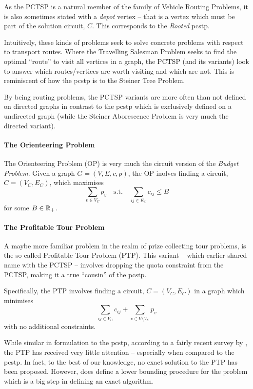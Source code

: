As the PCTSP is a natural member of the family of Vehicle Routing Problems, it is also sometimes
stated with a \textit{depot} vertex \citep{feillet2005traveling} -- that is a vertex which
must be part of the solution circuit, $C$. This corresponds to the \textit{Rooted}
\gls{pcstp}.

Intuitively, these kinds of problems seek to solve concrete problems with respect to transport routes.
Where the Travelling Salesman Problem seeks to find the optimal ``route'' to visit all vertices in
a graph, the PCTSP (and its variants) look to answer which routes/vertices are worth visiting and
which are not. This is reminiscent of how the \gls{pcstp} is to the Steiner Tree Problem.

By being routing problems, the PCTSP variants are more often than not defined on directed graphs in
contrast to the \gls{pcstp} which is exclusively defined on a undirected graph (while the Steiner Aborescence
 Problem is very much the directed variant).

\paragraph{The Orienteering Problem}
The Orienteering Problem (OP) is very much the circuit version of the \textit{Budget Problem}.
Given a graph $G  = (V, E, c, p)$, the OP inolves finding a circuit, $C = (V_C, E_C)$,
which maximises
$$\sum_{v \in V_C}  p_v \quad \text{s.t.} \quad \sum_{ij \in E_C} c_{ij} \leq B$$
for some $B \in \mathbb{R}_+$.

\paragraph{The Profitable Tour Problem}
A maybe more familiar problem in the realm of prize collecting tour problems, is the
so-called Profitable Tour Problem (PTP). This variant -- which earlier shared name with
the PCTSP -- involves dropping the quota constraint from the PCTSP, making it a true
 ``cousin'' of the \gls{pcstp}.

 Specifically, the PTP involves finding a circuit,
 $C = (V_C, E_C)$ in a graph which minimises
 $$\sum_{ij \in V_C} c_{ij} + \sum_{v \in V \setminus V_C} p_v$$
 with no additional constraints.
 
 While similar in formulation to the \gls{pcstp}, according to a fairly recent survey by
 \citet{archetti2014chapter}, the PTP has received very little attention -- 
 especially when compared to the \gls{pcstp}.
 In fact, to the best of our knowledge, no exact solution to the PTP
 has been proposed.
 However, \citet{dell1995prize} does define a lower bounding procedure for the problem
 which is a big step in defining an exact algorithm.
 
